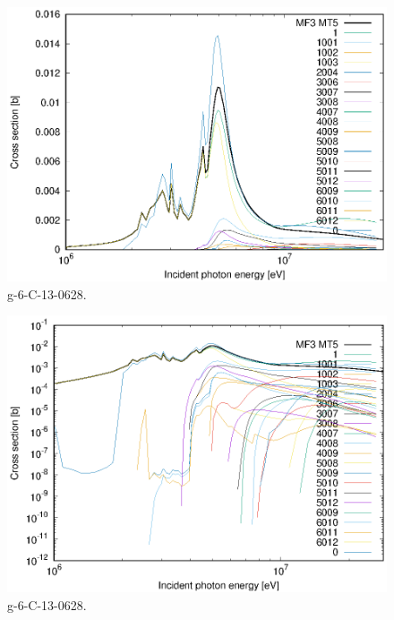 \begin{figure}
 \includegraphics[width=\linewidth]{eps/g_6-C-13_0628.eps}
  \caption{g-6-C-13-0628.}
\end{figure}
\begin{figure}
 \includegraphics[width=\linewidth]{eps-log/g_6-C-13_0628.eps}
 \caption{g-6-C-13-0628.}
\end{figure}
\newpage \clearpage

